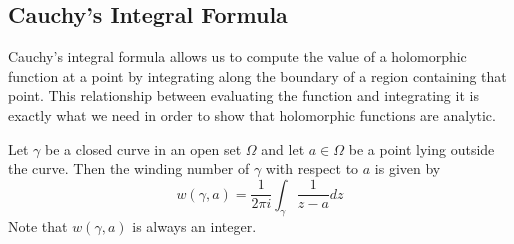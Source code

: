 \subsection{Cauchy's Integral Formula}
Cauchy's integral formula allows us to compute the value of a holomorphic function at a point by integrating along the boundary of a region containing that point. This relationship between evaluating the function and integrating it is exactly what we need in order to show that holomorphic functions are analytic.
\begin{definition}
Let $\gamma$ be a closed curve in an open set $\Omega$ and let $a \in \Omega$ be a point lying outside the curve. Then the winding number of $\gamma$ with respect to $a$ is given by
$$ w(\gamma, a) = \frac{1}{2\pi i} \int_\gamma \frac{1}{z - a}dz $$
Note that $w(\gamma, a)$ is always an integer.
\end{definition}

